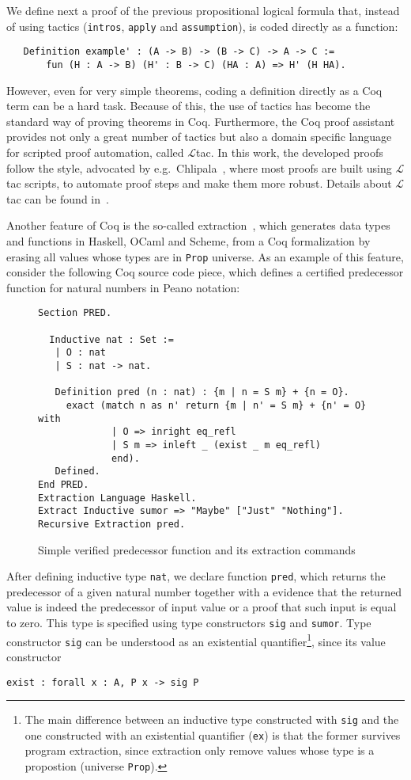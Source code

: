 We define next a proof of the previous propositional logical formula
that, instead of using tactics (\texttt{intros}, \texttt{apply} and
\texttt{assumption}), is coded directly as a function:
\begin{lstlisting}
   Definition example' : (A -> B) -> (B -> C) -> A -> C :=
       fun (H : A -> B) (H' : B -> C) (HA : A) => H' (H HA).
\end{lstlisting}
However, even for very simple theorems, coding a definition directly
as a Coq term can be a hard task. Because of this, the use of tactics
has become the standard way of proving theorems in Coq. Furthermore,
the Coq proof assistant provides not only a great number of tactics
but also a domain specific language for scripted proof automation,
called $\mathcal{L}$tac. In this work, the developed proofs follow the
style, advocated by e.g.~Chlipala~\cite{Chlipala13}, where most proofs
are built using $\mathcal{L}$tac scripts, to automate proof steps and
make them more robust. Details about $\mathcal{L}$tac can be found
in~\cite{Chlipala13,Bertot04}.

Another feature of Coq is the so-called extraction~\cite{Letouzey02}, which
generates data types and functions in Haskell, OCaml and Scheme, from
a Coq formalization by erasing all values whose types are in \lstinline|Prop|
universe. As an example of this feature, consider the following Coq
source code piece, which defines a certified predecessor function for natural
numbers in Peano notation:
\begin{figure}[h]
\begin{lstlisting}
Section PRED.

  Inductive nat : Set :=
   | O : nat
   | S : nat -> nat.

   Definition pred (n : nat) : {m | n = S m} + {n = O}.
     exact (match n as n' return {m | n' = S m} + {n' = O} with
             | O => inright eq_refl
             | S m => inleft _ (exist _ m eq_refl)
             end).
   Defined.
End PRED.
Extraction Language Haskell.
Extract Inductive sumor => "Maybe" ["Just" "Nothing"].
Recursive Extraction pred.
\end{lstlisting}
\centering
\caption{Simple verified predecessor function and its extraction commands}
\label{fig:coqpred}
\end{figure}

After defining inductive type \lstinline|nat|, we declare function
\lstinline|pred|, which returns the predecessor of a given natural
number together with a evidence that the returned value is indeed the
predecessor of input value or a proof that such input is equal to
zero. This type is specified using type constructors \lstinline|sig|
and \lstinline|sumor|. Type constructor \lstinline|sig| can be
understood as an existential quantifier\footnote{The main difference
  between an inductive type constructed with \lstinline|sig| and the
  one constructed with an existential quantifier (\lstinline|ex|) is
  that the former survives program extraction, since extraction only
  remove values whose type is a propostion (universe
  \lstinline|Prop|).}, since its value constructor
\begin{lstlisting}
exist : forall x : A, P x -> sig P
\end{lstlisting}

